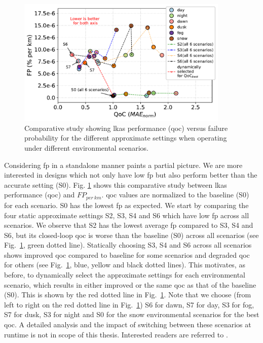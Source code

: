 \begin{figure}[t]
    \centering
    \includegraphics[width= 0.9\textwidth]{figs/fp_pareto_trim.pdf}
    \captionsetup{width=0.9\linewidth}
    \caption{{Comparative study showing \gls{lkas} performance (\gls{qoc}) versus failure probability for the different approximate settings when operating under different environmental scenarios.}}
    \label{fig:fp_pareto}
    \vspace{-20 pt}
\end{figure}
Considering \gls{fp} in a standalone manner paints a partial picture. We are more interested in designs which not only have low \gls{fp} but also perform better than the accurate setting (S0). Fig. \ref{fig:fp_pareto} shows this comparative study between \gls{lkas} performance (\gls{qoc}) and $FP_{per\ km}$. \gls{qoc} values are normalized to the baseline (S0) for each scenario. S0 has the lowest \gls{fp} as expected. We start by comparing the four static approximate settings S2, S3, S4 and S6 which have low \gls{fp} across all scenarios. We observe that S2 has the lowest average \gls{fp} compared to S3, S4 and S6, but its closed-loop \gls{qoc} is worse than the baseline (S0) across all scenarios (see Fig.\ \ref{fig:fp_pareto}, green dotted line). Statically choosing S3, S4 and S6 across all scenarios shows improved \gls{qoc} compared to baseline for some scenarios and degraded \gls{qoc} for others (see Fig.\ \ref{fig:fp_pareto}, blue, yellow and black dotted lines). This motivates, as before, to dynamically select the approximate settings for each environmental scenario, which results in either improved or the same \gls{qoc} as that of the baseline (S0). This is shown by the red dotted line in Fig.\ \ref{fig:fp_pareto}. Note that we choose (from left to right on the red dotted line in Fig.\ \ref{fig:fp_pareto}) S6 for dawn, S7 for day, S3 for fog, S7 for dusk, S3 for night and S0 for the snow environmental scenarios for the best \gls{qoc}. A detailed analysis and the impact of switching between these scenarios at runtime is not in scope of this thesis. Interested readers are referred to \cite{de2021hardware}.   

